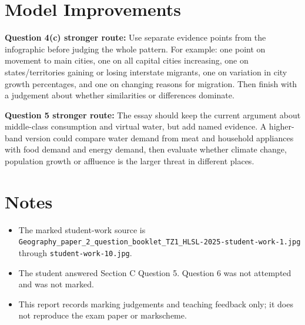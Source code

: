 \documentclass[11pt]{article}
\begin{document}
\section*{Model Improvements}

\textbf{Question 4(c) stronger route:}
Use separate evidence points from the infographic before judging the whole pattern. For example: one point on movement to main cities, one on all capital cities increasing, one on states/territories gaining or losing interstate migrants, one on variation in city growth percentages, and one on changing reasons for migration. Then finish with a judgement about whether similarities or differences dominate.

\textbf{Question 5 stronger route:}
The essay should keep the current argument about middle-class consumption and virtual water, but add named evidence. A higher-band version could compare water demand from meat and household appliances with food demand and energy demand, then evaluate whether climate change, population growth or affluence is the larger threat in different places.

\section*{Notes}

\begin{itemize}
  \item The marked student-work source is \texttt{Geography\_paper\_2\_question\_booklet\_TZ1\_HLSL-2025-student-work-1.jpg} through \texttt{student-work-10.jpg}.
  \item The student answered Section C Question 5. Question 6 was not attempted and was not marked.
  \item This report records marking judgements and teaching feedback only; it does not reproduce the exam paper or markscheme.
\end{itemize}
\end{document}
